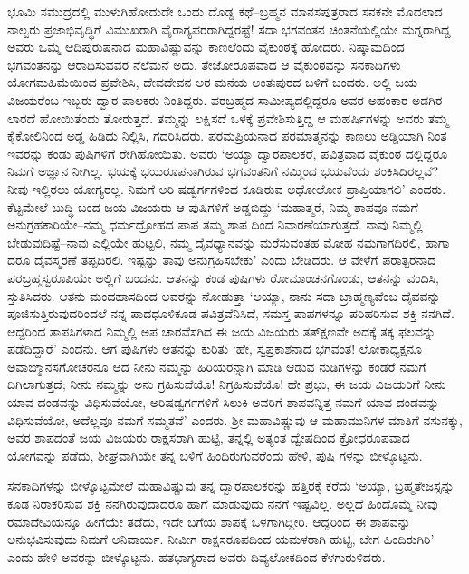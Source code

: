 ಭೂಮಿ ಸಮುದ್ರದಲ್ಲಿ ಮುಳುಗಿಹೋದುದೇ ಒಂದು ದೊಡ್ಡ ಕಥೆ–ಬ್ರಹ್ಮನ ಮಾನಸಪುತ್ರರಾದ ಸನಕನೇ ಮೊದಲಾದ ನಾಲ್ವರು ಪ್ರಜಾಭಿವೃದ್ಧಿಗೆ ವಿಮುಖರಾಗಿ ವೈರಾಗ್ಯಪರರಾಗಿದ್ದರಷ್ಟೆ! ಸದಾ ಭಗವಂತನ ಚಿಂತನೆಯಲ್ಲಿಯೇ ಮಗ್ನರಾಗಿದ್ದ ಅವರು ಒಮ್ಮೆ ಆದಿಪುರುಷನಾದ ಮಹಾವಿಷ್ಣುವನ್ನು ಕಾಣಲೆಂದು ವೈಕುಂಠಕ್ಕೆ ಹೋದರು. ನಿಷ್ಕಾಮದಿಂದ ಭಗವಂತನನ್ನು ಆರಾಧಿಸುವವರ ನೆಲೆಮನೆ ಅದು. ತೇಜೋರೂಪವಾದ ಆ ವೈಕುಂಠವನ್ನು ಸನಕಾದಿಗಳು ಯೋಗಮಹಿಮೆಯಿಂದ ಪ್ರವೇಶಿಸಿ, ದೇವದೇವನ ಅರ ಮನೆಯ ಅಂತಃಪುರದ ಬಳಿಗೆ ಬಂದರು. ಅಲ್ಲಿ ಜಯ ವಿಜಯರೆಂಬ ಇಬ್ಬರು ದ್ವಾರ ಪಾಲಕರು ನಿಂತಿದ್ದರು. ಪರಬ್ರಹ್ಮದ ಸಾಮೀಪ್ಯದಲ್ಲಿದ್ದರೂ ಅವರ ಅಹಂಕಾರ ಅಡಗಿರ ಲಾರದೆ ಹೋಯಿತೆಂದು ತೋರುತ್ತದೆ. ತಮ್ಮನ್ನು ಲಕ್ಷಿಸದೆ ಒಳಕ್ಕೆ ಪ್ರವೇಶಿಸುತ್ತಿದ್ದ ಆ ಮಹರ್ಷಿಗಳನ್ನು ಅವರು ತಮ್ಮ ಕೈಕೋಲಿನಿಂದ ಅಡ್ಡ ಹಿಡಿದು ನಿಲ್ಲಿಸಿ, ಗದರಿಸಿದರು. ಪರಮಪ್ರಿಯನಾದ ಪರಮಾತ್ಮನನ್ನು ಕಾಣಲು ಅಡ್ಡಿಯಾಗಿ ನಿಂತ ಇವರನ್ನು ಕಂಡು ಪುಷಿಗಳಿಗೆ ರೇಗಿಹೋಯಿತು. ಅವರು ‘ಅಯ್ಯಾ ದ್ವಾರಪಾಲಕರೆ, ಪವಿತ್ರವಾದ ವೈಕುಂಠ ದಲ್ಲಿದ್ದರೂ ನಿಮಗೆ ಅಜ್ಞಾನ ನೀಗಿಲ್ಲ. ಭಯಕ್ಕೆ ಭಯರೂಪನಾಗಿರುವ ಭಗವಂತನಿಗೆ ನಮ್ಮಿಂದ ಭಯವೆಂದು ಶಂಕಿಸಿದಿರಲ್ಲವೆ? ನೀವು ಇಲ್ಲಿರಲು ಯೋಗ್ಯರಲ್ಲ. ನಿಮಗೆ ಅರಿ ಷಡ್ವರ್ಗಗಳಿಂದ ಕೂಡಿರುವ ಅಧೋಲೋಕ ಪ್ರಾಪ್ತಿಯಾಗಲಿ’ ಎಂದರು. ಕೆಟ್ಟಮೇಲೆ ಬುದ್ಧಿ ಬಂದ ಜಯ ವಿಜಯರು ಆ ಪುಷಿಗಳಿಗೆ ಅಡ್ಡಬಿದ್ದು ‘ಮಹಾತ್ಮರೆ, ನಿಮ್ಮ ಶಾಪವೂ ನಮಗೆ ಅನುಗ್ರಹಕಾರಿಯೇ–ನಮ್ಮ ಧರ್ಮದ್ರೋಹದ ಪಾಪ ತಮ್ಮ ಶಾಪ ದಿಂದ ನಿವಾರಣೆಯಾಗುತ್ತದೆ. ನಾವು ನಿಮ್ಮಲ್ಲಿ ಬೇಡುವುದಿಷ್ಟೆ–ನಾವು ಎಲ್ಲಿಯೇ ಹುಟ್ಟಲಿ, ನಮ್ಮ ದೈವಧ್ಯಾನವನ್ನು ಮರೆಸುವಂತಹ ಮೋಹ ನಮಗಾಗದಿರಲಿ, ಹಾಗಾ ದರೂ ದೈವಸ್ಮರಣೆ ತಪ್ಪದಿರಲಿ. ಇಷ್ಟನ್ನು ತಾವು ಅನುಗ್ರಹಿಸಬೇಕು’ ಎಂದು ಬೇಡಿದರು. ಆ ವೇಳೆಗೆ ಪರಾತ್ಪರನಾದ ಪರಬ್ರಹ್ಮಸ್ವರೂಪಿಯೇ ಅಲ್ಲಿಗೆ ಬಂದನು. ಆತನನ್ನು ಕಂಡ ಪುಷಿಗಳು ರೋಮಾಂಚನಗೊಂಡು, ಆತನನ್ನು ವಂದಿಸಿ, ಸ್ತುತಿಸಿದರು. ಆತನು ಮಂದಹಾಸದಿಂದ ಅವರನ್ನು ನೋಡುತ್ತಾ ‘ಅಯ್ಯಾ, ನಾನು ಸದಾ ಬ್ರಾಹ್ಮಣ್ಯವೆಂಬ ದೈವವನ್ನು ಪೂಜಿಸುತ್ತಿರುವುದರಿಂದಲೆ ನನ್ನ ಪಾದಧೂಳಿಕೂಡ ಪವಿತ್ರವೆನಿಸಿದೆ, ಸಮಸ್ತ ಪಾಪಗಳನ್ನೂ ಪರಿಹರಿಸುವ ಶಕ್ತಿ ನನಗಿದೆ. ಆದ್ದರಿಂದ ತಾಪಸಿಗಳಾದ ನಿಮ್ಮಲ್ಲಿ ಅಪ ಚಾರವೆಸಗಿದ ಈ ಜಯ ವಿಜಯರು ತತ್​ಕ್ಷಣವೇ ಅದಕ್ಕೆ ತಕ್ಕ ಫಲವನ್ನು ಪಡೆದಿದ್ದಾರೆ’ ಎಂದನು. ಆಗ ಪುಷಿಗಳು ಆತನನ್ನು ಕುರಿತು ‘ಹೇ, ಸ್ವಪ್ರಕಾಶನಾದ ಭಗವಂತ! ಲೋಕಾಧ್ಯಕ್ಷನೂ ಅವಾಙ್ಮಾನಸಗೋಚರನೂ ಆದ ನೀನು ನಮ್ಮನ್ನು ಹಿರಿಯರನ್ನಾಗಿ ಮಾಡಿ ಆಡುವ ನುಡಿಗಳನ್ನು ಕಂಡರೆ ನಮಗೆ ದಿಗಿಲಾಗುತ್ತದೆ; ನೀನು ನಮ್ಮನ್ನು ಅನು ಗ್ರಹಿಸುವೆಯೊ! ನಿಗ್ರಹಿಸುವೆಯೊ! ಹೇ ಪ್ರಭು, ಈ ಜಯ ವಿಜಯರಿಗೆ ನೀನು ಯಾವ ದಂಡವನ್ನು ವಿಧಿಸುವೆಯೋ, ಅರಿಷಡ್ವರ್ಗಗಳಿಗೆ ಸಿಲುಕಿ ಅವರಿಗೆ ಶಾಪವನ್ನಿತ್ತ ನಮಗೆ ಯಾವ ದಂಡವನ್ನು ವಿಧಿಸುವೆಯೋ, ಅದೆಲ್ಲವೂ ನಮಗೆ ಸಮ್ಮತವೆ’ ಎಂದರು. ಶ್ರೀ ಮಹಾವಿಷ್ಣುವು ಆ ಮಹಾಮುನಿಗಳ ಮಾತಿಗೆ ನಸುನಕ್ಕು, ಅವರ ಶಾಪದಂತೆ ಜಯ ವಿಜಯರು ರಾಕ್ಷಸರಾಗಿ ಹುಟ್ಟಿ, ತನ್ನಲ್ಲಿ ಅತ್ಯಂತ ದ್ವೇಷದಿಂದ ಕ್ರೋಧರೂಪವಾದ ಯೋಗವನ್ನು ಪಡೆದು, ಶೀಘ್ರವಾಗಿಯೇ ತನ್ನ ಬಳಿಗೆ ಹಿಂದಿರುಗುವರೆಂದು ಹೇಳಿ, ಪುಷಿ ಗಳನ್ನು ಬೀಳ್ಕೊಟ್ಟನು.

ಸನಕಾದಿಗಳನ್ನು ಬೀಳ್ಕೊಟ್ಟಮೇಲೆ ಮಹಾವಿಷ್ಣುವು ತನ್ನ ದ್ವಾರಪಾಲಕರನ್ನು ಹತ್ತಿರಕ್ಕೆ ಕರೆದು ‘ಅಯ್ಯಾ, ಬ್ರಹ್ಮತೇಜಸ್ಸನ್ನು ಕೂಡ ನಿರಾಕರಿಸುವ ಶಕ್ತಿ ನನಗಿರುವುದಾದರೂ ಹಾಗೆ ಮಾಡುವುದು ನನಗೆ ಇಷ್ಟವಿಲ್ಲ. ಅಲ್ಲದೆ ಹಿಂದೊಮ್ಮೆ ನೀವು ರಮಾದೇವಿಯನ್ನೂ ಹೀಗೆಯೇ ತಡೆದು, ಇದೇ ಬಗೆಯ ಶಾಪಕ್ಕೆ ಒಳಗಾಗಿದ್ದೀರಿ. ಆದ್ದರಿಂದ ಈ ಶಾಪವನ್ನು ಅನುಭವಿಸುವುದು ನಿಮಗೆ ಅನಿವಾರ್ಯ. ನೀವೀಗ ರಾಕ್ಷಸರೂಪದಿಂದ ಯಮಳರಾಗಿ ಹುಟ್ಟಿ, ಬೇಗ ಹಿಂದಿರುಗಿರಿ’ ಎಂದು ಹೇಳಿ ಅವರನ್ನು ಬೀಳ್ಕೊಟ್ಟನು. ಹತಭಾಗ್ಯರಾದ ಅವರು ದಿವ್ಯಲೋಕದಿಂದ ಕೆಳಗುರುಳಿದರು.

